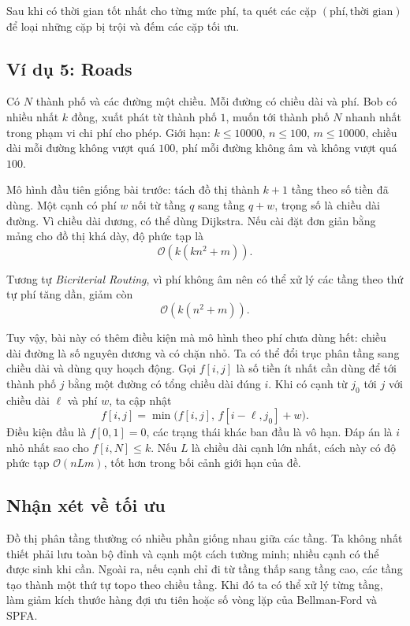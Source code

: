 \documentclass[11pt]{article}
\newcommand{\Oh}{\mathcal{O}}
\begin{document}
Sau khi có thời gian tốt nhất cho từng mức phí, ta quét các cặp
\((\text{phí},\text{thời gian})\) để loại những cặp bị trội và đếm các cặp
tối ưu.

\subsection{Ví dụ 5: Roads}

Có \(N\) thành phố và các đường một chiều. Mỗi đường có chiều dài và phí. Bob
có nhiều nhất \(k\) đồng, xuất phát từ thành phố \(1\), muốn tới thành phố
\(N\) nhanh nhất trong phạm vi chi phí cho phép. Giới hạn: \(k\le 10000\),
\(n\le 100\), \(m\le 10000\), chiều dài mỗi đường không vượt quá \(100\), phí
mỗi đường không âm và không vượt quá \(100\).

Mô hình đầu tiên giống bài trước: tách đồ thị thành \(k+1\) tầng theo số tiền
đã dùng. Một cạnh có phí \(w\) nối từ tầng \(q\) sang tầng \(q+w\), trọng số
là chiều dài đường. Vì chiều dài dương, có thể dùng Dijkstra. Nếu cài đặt đơn
giản bằng mảng cho đồ thị khá dày, độ phức tạp là
\[
  \Oh(k(kn^2+m)).
\]

Tương tự \textit{Bicriterial Routing}, vì phí không âm nên có thể xử lý các
tầng theo thứ tự phí tăng dần, giảm còn
\[
  \Oh(k(n^2+m)).
\]

Tuy vậy, bài này có thêm điều kiện mà mô hình theo phí chưa dùng hết: chiều
dài đường là số nguyên dương và có chặn nhỏ. Ta có thể đổi trục phân tầng sang
chiều dài và dùng quy hoạch động. Gọi \(f[i,j]\) là số tiền ít nhất cần dùng
để tới thành phố \(j\) bằng một đường có tổng chiều dài đúng \(i\). Khi có
cạnh từ \(j_0\) tới \(j\) với chiều dài \(\ell\) và phí \(w\), ta cập nhật
\[
  f[i,j] =
  \min\bigl(f[i,j],\, f[i-\ell,j_0]+w\bigr).
\]
Điều kiện đầu là \(f[0,1]=0\), các trạng thái khác ban đầu là vô hạn. Đáp án
là \(i\) nhỏ nhất sao cho \(f[i,N]\le k\). Nếu \(L\) là chiều dài cạnh lớn
nhất, cách này có độ phức tạp \(\Oh(nLm)\), tốt hơn trong bối cảnh giới hạn
của đề.

\subsection{Nhận xét về tối ưu}

Đồ thị phân tầng thường có nhiều phần giống nhau giữa các tầng. Ta không nhất
thiết phải lưu toàn bộ đỉnh và cạnh một cách tường minh; nhiều cạnh có thể
được sinh khi cần. Ngoài ra, nếu cạnh chỉ đi từ tầng thấp sang tầng cao, các
tầng tạo thành một thứ tự topo theo chiều tầng. Khi đó ta có thể xử lý từng
tầng, làm giảm kích thước hàng đợi ưu tiên hoặc số vòng lặp của Bellman-Ford
và SPFA.
\end{document}

